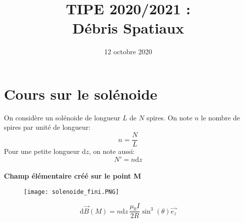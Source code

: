 \documentclass[a4paper,1pt]{article}
\title{TIPE 2020/2021 : \\ Débris Spatiaux}
\date{12 octobre 2020}
\begin{document}
\maketitle

\section*{Cours sur le solénoide}
On considère un solénoide de longueur $L$ de $N$ spires. On note $n$ le nombre de spires par unité de longueur:
$$n= \frac{N}{L}$$
Pour une petite longueur d$z$, on note aussi:
$$N'=n\mathrm{d}z$$
\\
\textbf{Champ élémentaire créé sur le point M}
\begin{figure}[h]
    \texttt{[image: solenoide\_fini.PNG]}
\end{figure}

$$\mathrm{d} \overset{\to}{B}(M) = n\mathrm{d}z\, \frac{\mu_0 I}{2 R} \sin^3(\theta) \overset{\to}{e_z}$$
\end{document}
